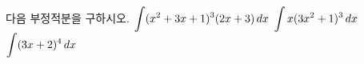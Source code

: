다음 부정적분을 구하시오.
 $\displaystyle\int(x^2+3x+1)^3(2x+3)\mkern3mu dx$
 $\displaystyle\int x(3x^2+1)^3\mkern3mu dx$
 $\displaystyle\int(3x+2)^4\mkern3mu dx$
